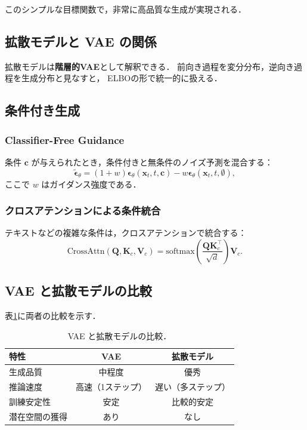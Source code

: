 このシンプルな目標関数で，非常に高品質な生成が実現される．

\subsection{拡散モデルと VAE の関係}

拡散モデルは\textbf{階層的VAE}として解釈できる．
前向き過程を変分分布，逆向き過程を生成分布と見なすと，
ELBOの形で統一的に扱える．

\subsection{条件付き生成}

\subsubsection{Classifier-Free Guidance}

条件 $\boldsymbol{c}$ が与えられたとき，条件付きと無条件のノイズ予測を混合する：
\begin{equation}
  \tilde{\boldsymbol{\epsilon}}_\theta = (1+w)\boldsymbol{\epsilon}_\theta(\boldsymbol{x}_t, t, \boldsymbol{c}) - w\boldsymbol{\epsilon}_\theta(\boldsymbol{x}_t, t, \emptyset),
  \label{eq:cfg}
\end{equation}
ここで $w$ はガイダンス強度である．

\subsubsection{クロスアテンションによる条件統合}

テキストなどの複雑な条件は，クロスアテンションで統合する：
\begin{equation}
  \mathrm{CrossAttn}(\mathbf{Q}, \mathbf{K}_c, \mathbf{V}_c) = \mathrm{softmax}\left(\frac{\mathbf{Q}\mathbf{K}_c^\top}{\sqrt{d}}\right)\mathbf{V}_c.
\end{equation}

\subsection{VAE と拡散モデルの比較}

表\ref{tab:vae-vs-diffusion}に両者の比較を示す．

\begin{table}[hbtp]
  \centering
  \caption{VAE と拡散モデルの比較．}
  \label{tab:vae-vs-diffusion}
  \begin{tabular}{lcc}
    \toprule
    特性 & VAE & 拡散モデル \\
    \midrule
    生成品質 & 中程度 & 優秀 \\
    推論速度 & 高速（1ステップ） & 遅い（多ステップ） \\
    訓練安定性 & 安定 & 比較的安定 \\
    潜在空間の獲得 & あり & なし \\
    \bottomrule
  \end{tabular}
\end{table}

